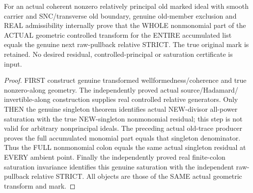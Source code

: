 \begin{theorem}
\label{hir:sharp-actual-controlled-all-accumulated-nonmonomial-strict-dictionary}
\leanok
For an actual coherent nonzero relatively principal old marked ideal with
smooth carrier and SNC/transverse old boundary, genuine old-member
exclusion and REAL admissibility internally prove that the WHOLE
nonmonomial part of the ACTUAL geometric controlled transform for the
ENTIRE accumulated list equals the genuine next raw-pullback relative
STRICT. The true original mark is retained. No desired residual,
controlled-principal or saturation certificate is input.
\end{theorem}
\begin{proof}
FIRST construct genuine transformed wellformedness/coherence and true
nonzero-along geometry. The independently proved actual source/Hadamard/
invertible-along construction supplies real controlled relative generators.
Only THEN the genuine singleton theorem identifies actual NEW-divisor
all-power saturation with the true NEW-singleton nonmonomial residual;
this step is not valid for arbitrary nonprincipal ideals. The preceding
actual old-trace producer proves the full accumulated monomial part equals
that singleton denominator. Thus the FULL nonmonomial colon equals the
same actual singleton residual at EVERY ambient point. Finally the
independently proved real finite-colon saturation invariance identifies
this genuine saturation with the independent raw-pullback relative STRICT.
All objects are those of the SAME actual geometric transform and mark.
\end{proof}

